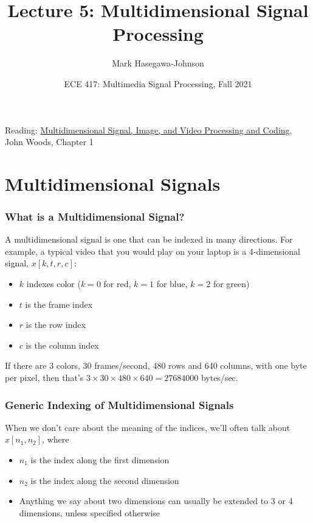 \documentclass{beamer}
\title{Lecture 5: Multidimensional Signal Processing}
\author{Mark Hasegawa-Johnson}
\date{ECE 417: Multimedia Signal Processing, Fall 2021}
\begin{document}
\begin{frame}
  \maketitle
\end{frame}

\begin{frame}
Reading: \href{https://www.google.com/books/edition/Multidimensional_Signal_Image_and_Video/0lJ0atc5X-UC?hl=en&gbpv=1&dq=multidimensional+signal+processing+tutorial&pg=PP1&printsec=frontcover}{\color{blue}Multidimensional Signal, Image, and Video Processing and Coding}, John Woods, Chapter 1
\end{frame}

\begin{frame}
  \tableofcontents
\end{frame}


\section[Signals]{Multidimensional Signals}
\setcounter{subsection}{1}

\begin{frame}
  \frametitle{What is a Multidimensional Signal?}

  A multidimensional signal is one that can be indexed in many
  directions.  For example, a typical video that you would play on
  your laptop is a 4-dimensional signal, $x[k,t,r,c]$:
  \begin{itemize}
  \item $k$ indexes color ($k=0$ for red, $k=1$ for blue, $k=2$ for green)
  \item $t$ is the frame index
  \item $r$ is the row index
  \item $c$ is the column index
  \end{itemize}
  If there are 3 colors, 30 frames/second, 480 rows and 640 columns,
  with one byte per pixel, then that's $3\times 30\times 480\times
  640=27684000$ bytes/sec.
\end{frame}
  
\begin{frame}
  \frametitle{Generic Indexing of Multidimensional Signals}

  When we don't care about the meaning of the indices, we'll often
  talk about $x[n_1,n_2]$, where
  \begin{itemize}
  \item $n_1$ is the index along the first dimension
  \item $n_2$ is the index along the second dimension
  \item Anything we say about two dimensions can usually be extended
    to 3 or 4 dimensions, unless specified otherwise
  \end{itemize}
\end{frame}
\end{document}
